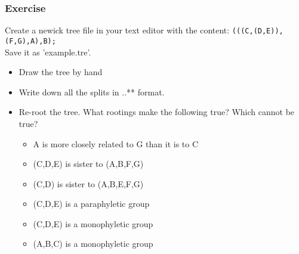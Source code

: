 \documentclass{beamer}
\begin{document}
\begin{frame}
\frametitle{Exercise}
Create a newick tree file in your text editor with the content:
\texttt{(((C,(D,E)),(F,G),A),B);}\\
Save it as 'example.tre'.\\
\begin{itemize}
 \item Draw the tree by hand
 \item Write down all the splits in ..** format.
 \item Re-root  the tree. What rootings make the following true? Which cannot be true?
 \begin{itemize}
 \item A is more closely related to G than it is to C
 \item (C,D,E) is sister to (A,B,F,G)
 \item (C,D) is sister to (A,B,E,F,G)
 \item (C,D,E) is a paraphyletic group
 \item (C,D,E) is a monophyletic group
 \item (A,B,C) is a monophyletic group
 \end{itemize}
\end{itemize}
\end{frame}
\end{document}
